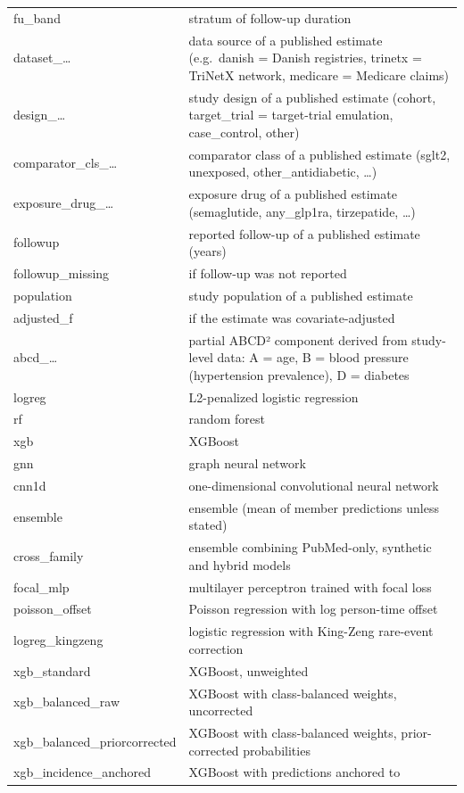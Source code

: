 \documentclass[
  11pt,
]{article}
\begin{document}
\begin{longtable}[]{@{}
  >{\raggedright\arraybackslash}p{}
  >{\raggedright\arraybackslash}p{}@{}}
fu\_band & stratum of follow-up duration \\
dataset\_\ldots{} & data source of a published estimate (e.g.~danish =
Danish registries, trinetx = TriNetX network, medicare = Medicare
claims) \\
design\_\ldots{} & study design of a published estimate (cohort,
target\_trial = target-trial emulation, case\_control, other) \\
comparator\_cls\_\ldots{} & comparator class of a published estimate
(sglt2, unexposed, other\_antidiabetic, \ldots) \\
exposure\_drug\_\ldots{} & exposure drug of a published estimate
(semaglutide, any\_glp1ra, tirzepatide, \ldots) \\
followup & reported follow-up of a published estimate (years) \\
followup\_missing & 1 if follow-up was not reported \\
population & study population of a published estimate \\
adjusted\_f & 1 if the estimate was covariate-adjusted \\
abcd\_\ldots{} & partial ABCD² component derived from study-level data:
A = age, B = blood pressure (hypertension prevalence), D = diabetes \\
logreg & L2-penalized logistic regression \\
rf & random forest \\
xgb & XGBoost \\
gnn & graph neural network \\
cnn1d & one-dimensional convolutional neural network \\
ensemble & ensemble (mean of member predictions unless stated) \\
cross\_family & ensemble combining PubMed-only, synthetic and hybrid
models \\
focal\_mlp & multilayer perceptron trained with focal loss \\
poisson\_offset & Poisson regression with log person-time offset \\
logreg\_kingzeng & logistic regression with King-Zeng rare-event
correction \\
xgb\_standard & XGBoost, unweighted \\
xgb\_balanced\_raw & XGBoost with class-balanced weights, uncorrected \\
xgb\_balanced\_priorcorrected & XGBoost with class-balanced weights,
prior-corrected probabilities \\
xgb\_incidence\_anchored & XGBoost with predictions anchored to

\end{longtable}
\end{document}

